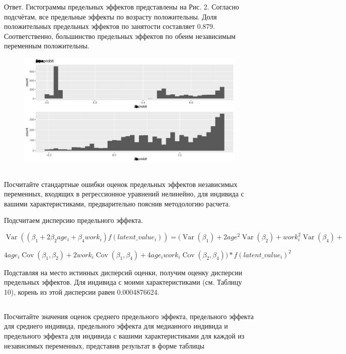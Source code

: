 \documentclass[a4paper,12pt]{article}
\def \cov{{\operatorname{Cov}}}
\DeclareMathOperator{\Var}{Var}
\def \b{\beta}
\begin{document}
Ответ. Гистограммы предельных эффектов представлены на Рис. 2.
Согласно подсчётам, все предельные эффекты по возрасту положительны. Доля  положительных предельных эффектов по занятости составляет 0.879. Соответственно, большинство предельных эффектов по обеим независимым переменным положительны.



\begin{figure}[!h]
	\includegraphics[width=\linewidth]{me_probit}
	\caption{ \label{his2}}
\end{figure}


\subsection{}
 Посчитайте стандартные ошибки оценок предельных эффектов независимых
переменных, входящих в регрессионное уравнений нелинейно, для индивида с вашими
характеристиками, предварительно пояснив методологию расчета.

Подсчитаем дисперсию предельного эффекта.

\[ \Var((\b_1 + 2\b_2 age_i + \b_4 work_i)f(latent\_value_i)) = (\Var(\b_1) + 2 age^2 \Var(\b_2) + work_i^2 \Var(\b_4) +\]

\[  4 age_i \cov(\b_1, \b_2) + 2 work_i \cov(\b_1, \b_4) + 4 age_i work_i \cov(\b_2, \b_4)) * f(latent\_value_i)^2 \]

Подставляя на место истинных дисперсий оценки, получим оценку дисперсии предельных эффектов. Для индивида с моими характеристиками (см. Таблицу 10), корень из этой дисперсии равен 0.0004876624.

\subsection{}

\Sun  Посчитайте значения оценок среднего предельного эффекта, предельного
эффекта для среднего индивида, предельного эффекта для медианного индивида и
предельного эффекта для индивида с вашими характеристиками для каждой из
независимых переменных, представив результат в форме таблицы
\end{document}

